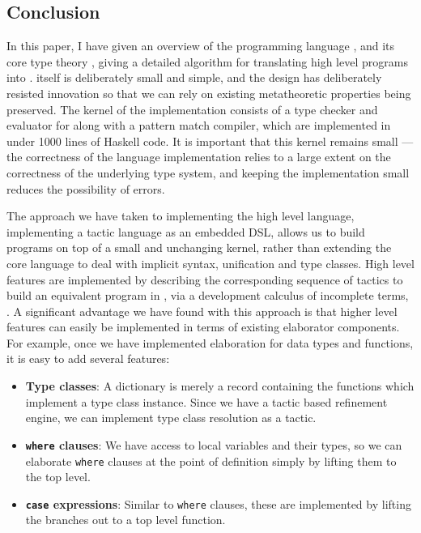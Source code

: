 

\subsection{Conclusion}

In this paper, I have given an overview of the programming language \Idris{},
and its core type theory \TT{}, giving a detailed algorithm for translating
high level programs into \TT{}.
\TT{} itself is deliberately small and simple, and the design has deliberately
resisted innovation so that we can rely on existing metatheoretic properties
being preserved. The kernel of the \Idris{} implementation consists of a type checker
and evaluator for \TT{} along with a pattern match compiler, which are implemented
in under 1000 lines of Haskell code. It is important that this kernel remains small
--- the correctness of the language implementation relies to a large extent on
the correctness of the underlying type system, and keeping the implementation small
reduces the possibility of errors.

The approach we have taken to implementing the high level language, implementing
a tactic language as an embedded DSL, allows us to
build programs on top of a small and unchanging kernel, rather than extending 
the core language to deal with implicit syntax, unification and type classes.
High level \Idris{} features are implemented by describing the corresponding
sequence of tactics to build an equivalent program in \TT{}, via a development
calculus of incomplete terms, \TTdev{}. A significant advantage we have found with
this approach is that higher level features can easily be implemented in terms
of existing elaborator components. For example, once we have implemented elaboration
for data types and functions, it is easy to add several features:

\begin{itemize}
\item \textbf{Type classes}: A dictionary is merely a record containing the
functions which implement a type class instance. Since we have a tactic based
refinement engine, we can implement type class resolution as a tactic.
\item \textbf{\texttt{where} clauses}: We have access to local variables and
their types, so we can
elaborate \texttt{where} clauses at the point of definition simply by lifting
them to the top level. 
\item \textbf{\texttt{case} expressions}: Similar to \texttt{where} clauses,
these are implemented by lifting the branches out to a top level function.
\end{itemize}

